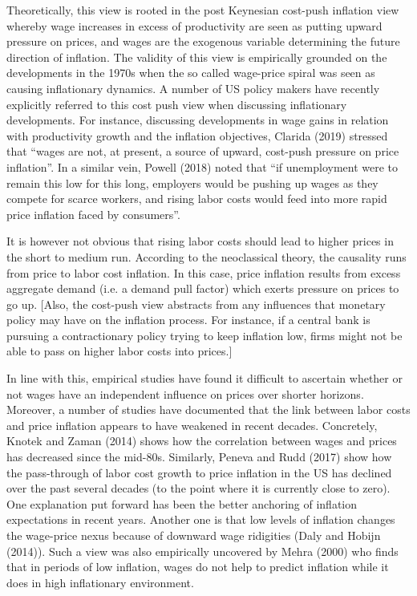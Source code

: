 \documentclass[11pt]{article}
\begin{document}
Theoretically, this view is rooted in the post Keynesian cost-push inflation view whereby wage increases in excess of productivity are seen as putting upward pressure on prices, and wages are the exogenous variable determining the future direction of inflation. The validity of this view is empirically grounded on the developments in the 1970s when the so called wage-price spiral was seen as causing inflationary dynamics.
A number of US policy makers have recently explicitly referred to this cost push view when discussing inflationary developments. For instance, discussing developments in wage gains in relation with productivity growth and the inflation objectives, Clarida (2019) stressed that “wages are not, at present, a source of upward, cost-push pressure on price inflation”. In a similar vein, Powell (2018) noted that “if unemployment were to remain this low for this long, employers would be pushing up wages as they compete for scarce workers, and rising labor costs would feed into more rapid price inflation faced by consumers”.


It is however not obvious that rising labor costs should lead to higher prices in the short to medium run. According to the neoclassical theory, the causality runs from price to labor cost inflation. In this case, price inflation results from excess aggregate demand (i.e. a demand pull factor) which exerts pressure on prices to go up. [Also, the cost-push view abstracts from any influences that monetary policy may have on the inflation process. For instance, if a central bank is pursuing a contractionary policy trying to keep inflation low, firms might not be able to pass on higher labor costs into prices.]


In line with this, empirical studies have found it difficult to ascertain whether or not wages have an independent influence on prices over shorter horizons. Moreover, a number of studies have documented that the link between labor costs and price inflation appears to have weakened in recent decades. Concretely, Knotek and Zaman (2014) shows how the correlation between wages and prices has decreased since the mid-80s. Similarly, Peneva and Rudd (2017) show how the pass-through of labor cost growth to price inflation in the US has declined over the past several decades (to the point where it is currently close to zero). One explanation put forward has been the better anchoring of inflation expectations in recent years. Another one is that low levels of inflation changes the wage-price nexus because of downward wage ridigities (Daly and Hobijn (2014)). Such a view was also empirically uncovered by Mehra (2000) who finds that in periods of low inflation, wages do not help to predict inflation while it does in high inflationary environment.
\end{document}
